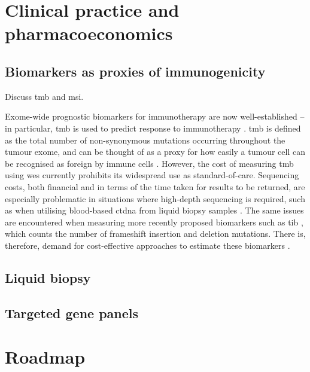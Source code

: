 \documentclass[../thesis.tex]{subfiles}
\begin{document}
\section{Clinical practice and pharmacoeconomics}

\subsection{Biomarkers as proxies of immunogenicity}
Discuss \acrshort{tmb} and \acrshort{msi}.

Exome-wide prognostic biomarkers for immunotherapy are now well-established -- in particular, \gls{tmb} is used to predict response to immunotherapy \citep{zhu_association_2019, cao_high_2019}.  \gls{tmb} is defined as the total number of non-synonymous mutations occurring throughout the tumour exome, and can be thought of as a proxy for how easily a tumour cell can be recognised as foreign by immune cells \citep{chan_development_2019}. However, the cost of measuring \gls{tmb} using \gls{wes} \citep{sboner_real_2011} currently prohibits its widespread use as standard-of-care.  Sequencing costs, both financial and in terms of the time taken for results to be returned, are especially problematic in situations where high-depth sequencing is required, such as when utilising blood-based \gls{ctdna} from liquid biopsy samples \citep{gandara_blood-based_2018}. The same issues are encountered when measuring more recently proposed biomarkers such as \gls{tib} \citep{wu_tumor_2019,turajlic_insertion-and-deletion-derived_2017}, which counts the number of frameshift insertion and deletion mutations. There is, therefore, demand for cost-effective approaches to estimate these biomarkers \citep{fancello_tumor_2019, golkaram_interplay_2020}.

\subsection{Liquid biopsy}
\citep{jensen_association_2020} \citep{genovese_clonal_2014} \citep{razavi_high-intensity_2019} \citep{schweizer_clinical_2019} \citep{annala_circulating_2018} \citep{goodall_circulating_2017}
\subsection{Targeted gene panels}

\section{Roadmap}

\dobib %
\end{document}
